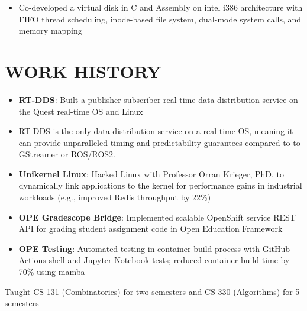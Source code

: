\documentclass[10pt]{article}
\begin{document}
\begin{FlushLeft}
  \begin{itemize}
  \item Co-developed a virtual disk in C and Assembly on intel i386 architecture with FIFO thread scheduling, inode-based file system, dual-mode system calls, and memory mapping
  \end{itemize}
  
\section{WORK HISTORY}

\begin{itemize}
\item \textbf{RT-DDS}: Built a publisher-subscriber real-time data distribution service on the Quest real-time OS and Linux
  \item RT-DDS is the only data distribution service on a real-time OS, meaning it can provide unparalleled timing and predictability guarantees compared to to GStreamer or ROS/ROS2.
\end{itemize}

\begin{itemize}
\item \textbf{Unikernel Linux}: Hacked Linux with Professor Orran Krieger, PhD, to dynamically link applications to the kernel for performance gains in industrial workloads (e.g., improved Redis throughput by 22\%)
\item \textbf{OPE Gradescope Bridge}: Implemented scalable OpenShift service REST API for grading student assignment code in Open Education Framework
\item \textbf{OPE Testing}: Automated testing in container build process with GitHub Actions shell and Jupyter Notebook tests; reduced container build time by 70\% using mamba
\end{itemize}

  \begin{itemize}{
    \item Taught CS 131 (Combinatorics) for two semesters and CS 330 (Algorithms) for 5 semesters
    }
  \end{itemize}

  

\end{FlushLeft}
\end{document}
